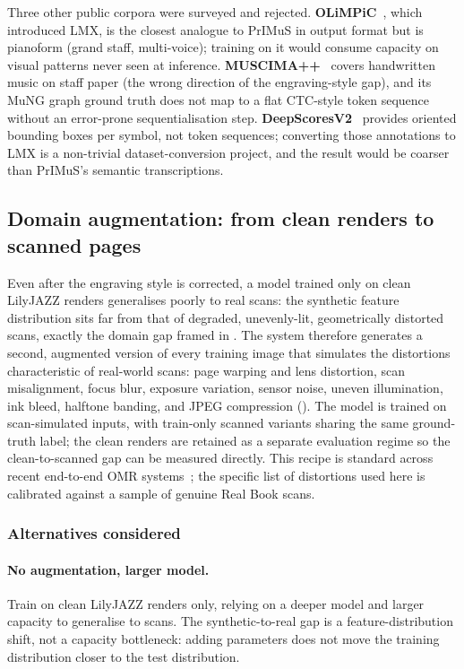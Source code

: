 Three other public corpora were surveyed and rejected.
\textbf{OLiMPiC}~\cite{mayerPracticalEndToEnd2024}, which introduced LMX, is the closest analogue to PrIMuS in output format but is pianoform (grand staff, multi-voice); training on it would consume capacity on visual patterns never seen at inference.
\textbf{MUSCIMA++}~\cite{hajicMuscimaPP2017} covers handwritten music on staff paper (the wrong direction of the engraving-style gap), and its MuNG graph ground truth does not map to a flat CTC-style token sequence without an error-prone sequentialisation step.
\textbf{DeepScoresV2}~\cite{tuggenerDeepScoresV22020} provides oriented bounding boxes per symbol, not token sequences; converting those annotations to LMX is a non-trivial dataset-conversion project, and the result would be coarser than PrIMuS's semantic transcriptions.

\subsection{Domain augmentation: from clean renders to scanned pages}

Even after the engraving style is corrected, a model trained only on
clean LilyJAZZ renders generalises poorly to real scans: the synthetic
feature distribution sits far from that of degraded, unevenly-lit,
geometrically distorted scans, exactly the domain gap framed in
.
The system therefore generates a second, augmented version of every
training image that simulates the distortions characteristic of
real-world scans: page warping and lens distortion, scan misalignment,
focus blur, exposure variation, sensor noise, uneven illumination, ink
bleed, halftone banding, and JPEG compression
().
The model is trained on scan-simulated inputs, with train-only scanned
variants sharing the same ground-truth label; the clean renders are
retained as a separate evaluation regime so the clean-to-scanned gap can
be measured directly.
This recipe is standard across recent end-to-end OMR
systems~\cite{calvoZaragozaCameraPrimus2018,mayerPracticalEndToEnd2024,riosVilaSMTPlusPlus2024,yangLEGATO2025};
the specific list of distortions used here is calibrated against a
sample of genuine Real Book scans.

\subsubsection*{Alternatives considered}

\paragraph{No augmentation, larger model.}
Train on clean LilyJAZZ renders only, relying on a deeper model and
larger capacity to generalise to scans.
The synthetic-to-real gap is a feature-distribution shift, not a
capacity bottleneck: adding parameters does not move the training
distribution closer to the test distribution.

